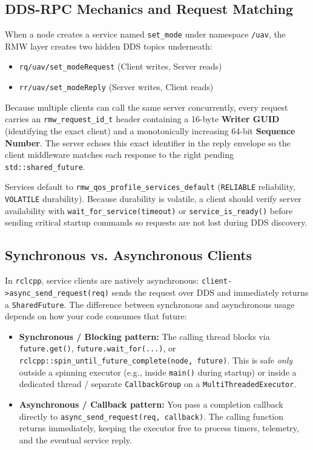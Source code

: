 \documentclass{article}
\begin{document}
\subsection{DDS-RPC Mechanics and Request Matching}
When a node creates a service named \texttt{set\_mode} under namespace \texttt{/uav}, the RMW layer creates two hidden DDS topics underneath:
\begin{itemize}
    \item \texttt{rq/uav/set\_modeRequest} (Client writes, Server reads)
    \item \texttt{rr/uav/set\_modeReply} (Server writes, Client reads)
\end{itemize}
Because multiple clients can call the same server concurrently, every request carries an \texttt{rmw\_request\_id\_t} header containing a 16-byte \textbf{Writer GUID} (identifying the exact client) and a monotonically increasing 64-bit \textbf{Sequence Number}. The server echoes this exact identifier in the reply envelope so the client middleware matches each response to the right pending \texttt{std::shared\_future}.

Services default to \texttt{rmw\_qos\_profile\_services\_default} (\texttt{RELIABLE} reliability, \texttt{VOLATILE} durability). Because durability is volatile, a client should verify server availability with \texttt{wait\_for\_service(timeout)} or \texttt{service\_is\_ready()} before sending critical startup commands so requests are not lost during DDS discovery.

\subsection{Synchronous vs. Asynchronous Clients}
In \texttt{rclcpp}, service clients are natively asynchronous: \texttt{client->async\_send\_request(req)} sends the request over DDS and immediately returns a \texttt{SharedFuture}. The difference between synchronous and asynchronous usage depends on how your code consumes that future:
\begin{itemize}
    \item \textbf{Synchronous / Blocking pattern:} The calling thread blocks via \texttt{future.get()}, \texttt{future.wait\_for(...)}, or \texttt{rclcpp::\allowbreak spin\_until\_future\_complete(node, future)}. This is safe \textit{only} outside a spinning executor (e.g., inside \texttt{main()} during startup) or inside a dedicated thread / separate \texttt{CallbackGroup} on a \texttt{MultiThreadedExecutor}.
    \item \textbf{Asynchronous / Callback pattern:} You pass a completion callback directly to \texttt{async\_send\_request(req, callback)}. The calling function returns immediately, keeping the executor free to process timers, telemetry, and the eventual service reply.
\end{itemize}
\end{document}
